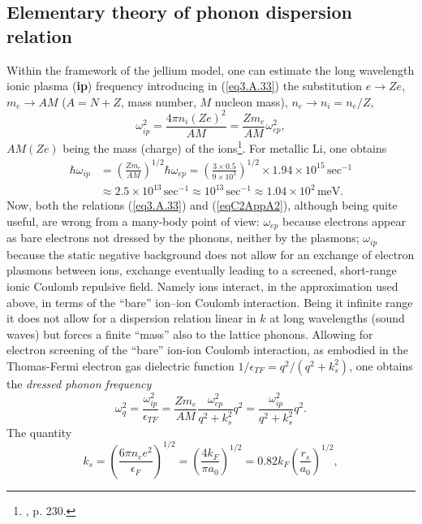 \subsection{Elementary theory of phonon dispersion relation}\label{App3A3}
Within the framework of the jellium model, one can estimate the long wavelength ionic plasma (\textbf{ip}) frequency introducing in (\ref{eq3.A.33})  the substitution $e\rightarrow Ze$, $m_e\rightarrow AM$ ($A=N+Z$, mass number, $M$ nucleon mass), $n_e\rightarrow n_i=n_e/Z$,
\begin{equation}\label{eqC2AppA2}
\omega_{ip}^2=\frac{4\pi n_i(Ze)^2}{AM}=\frac{Zm_e}{AM}\omega_{ep}^2,
\end{equation}
$AM (Ze)$ being the mass (charge) of the ions\footnote{\cite{Ketterson:99}, p. 230.}.
For metallic Li, one obtains
\begin{align}
\nonumber\hbar\omega_{ip}&=\left(\frac{Zm_e}{AM}\right)^{1/2}\hbar\omega_{ep}=\left(\frac{3\times0.5}{9\times10^3}\right)^{1/2}\times1.94\times 10^{15}\,\text{sec}^{-1}\\
&\approx2.5\times10^{13}\,\text{sec}^{-1}\approx10^{13}\,\text{sec}^{-1}\approx1.04\times10^2\,\text{meV}.
\end{align}
Now, both  the  relations (\ref{eq3.A.33}) and (\ref{eqC2AppA2}), although being quite useful, are wrong from a many-body point of view: $\omega_{ep}$ because electrons appear as bare electrons not dressed by the phonons, neither by the plasmons; $\omega_{ip}$ because the  static negative background does not allow for an exchange of electron plasmons between ions, exchange eventually leading to a screened, short-range ionic Coulomb repulsive field. Namely ions interact, in the approximation used above, in terms of the ``bare'' ion--ion Coulomb interaction. Being it infinite range it does not allow for a dispersion relation linear in $k$ at long wavelengths (sound waves) but forces a finite ``mass'' also to the lattice phonons. Allowing for electron screening of the ``bare'' ion-ion Coulomb interaction, as embodied in the Thomas-Fermi electron gas dielectric function $1/\epsilon_{TF}=q^2/(q^2+k_s^2)$, one obtains the \textit{dressed phonon frequency}
\begin{equation}\label{eqC2AppA3}
\omega_q^2=\frac{\omega_{ip}^2}{\epsilon_{TF}}=\frac{Zm_e}{AM}\frac{\omega_{ep}^2}{q^2+k_s^2}q^2=\frac{\omega_{ip}^2}{q^2+k_s^2}q^2.
\end{equation}
The quantity
\begin{equation}\label{eq3.A.43}
k_s=\left(\frac{6\pi n_ee^2}{\epsilon_F}\right)^{1/2}=\left(\frac{4k_F}{\pi a_0}\right)^{1/2}=0.82 k_F\left(\frac{r_s}{a_0}\right)^{1/2},
\end{equation}

